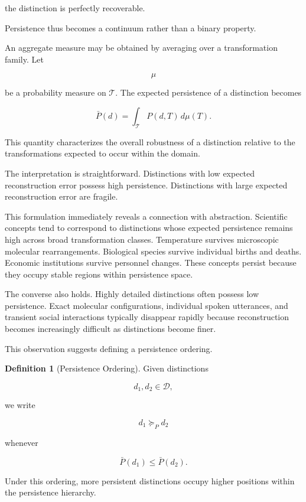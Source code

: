 \documentclass[12pt,oneside]{article}
\theoremstyle{definition}
\newtheorem{definition}[theorem]{Definition} \newtheorem{axiom}[theorem]{Axiom} \newtheorem{remark}[theorem]{Remark} \newtheorem{example}[theorem]{Example}
\begin{document}
the distinction is perfectly recoverable.

Persistence thus becomes a continuum rather than a binary property.

An aggregate measure may be obtained by averaging over a transformation family. Let

\[
\mu
\]

be a probability measure on \(\mathcal T\). The expected persistence of a distinction becomes

\[
\bar P(d)
=
\int_{\mathcal T}
P(d,T)
\,d\mu(T).
\]

This quantity characterizes the overall robustness of a distinction relative to the transformations expected to occur within the domain.

The interpretation is straightforward. Distinctions with low expected reconstruction error possess high persistence. Distinctions with large expected reconstruction error are fragile.

This formulation immediately reveals a connection with abstraction. Scientific concepts tend to correspond to distinctions whose expected persistence remains high across broad transformation classes. Temperature survives microscopic molecular rearrangements. Biological species survive individual births and deaths. Economic institutions survive personnel changes. These concepts persist because they occupy stable regions within persistence space.

The converse also holds. Highly detailed distinctions often possess low persistence. Exact molecular configurations, individual spoken utterances, and transient social interactions typically disappear rapidly because reconstruction becomes increasingly difficult as distinctions become finer.

This observation suggests defining a persistence ordering.

\begin{definition}[Persistence Ordering]

Given distinctions

\[
d_1,d_2\in\mathcal D,
\]

we write

\[
d_1 \succeq_P d_2
\]

whenever

\[
\bar P(d_1)
\le
\bar P(d_2).
\]

\end{definition}

Under this ordering, more persistent distinctions occupy higher positions within the persistence hierarchy.
\end{document}
